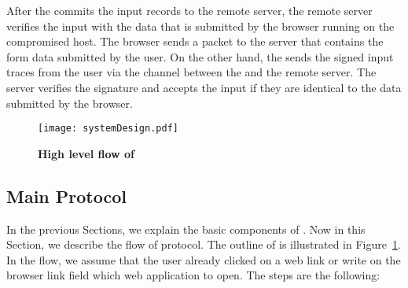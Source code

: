 After the \device commits the input records to the remote server, the remote server verifies the input with the data that is submitted by the browser running on the compromised host. The browser sends a \http packet to the server that contains the form data submitted by the user. On the other hand, the \device sends the signed input traces from the user via the \tls channel between the \device and the remote server. The server verifies the signature and accepts the input if they are identical to the data submitted by the browser.

\begin{figure}[t]
\centering
\texttt{[image: systemDesign.pdf]}
\caption{\textbf{High level flow of \name}}
\label{fig:systemDesign}
\centering
\end{figure}

\subsection{Main Protocol}
\label{sec:systemDesign:mainProtocol}

In the previous Sections, we explain the basic components of \name. Now in this Section, we describe the flow of \name protocol. The outline of \name is illustrated in Figure~\ref{fig:systemDesign}. In the flow, we assume that the user already clicked on a web link or write on the browser link field which web application to open. The steps are the following:


